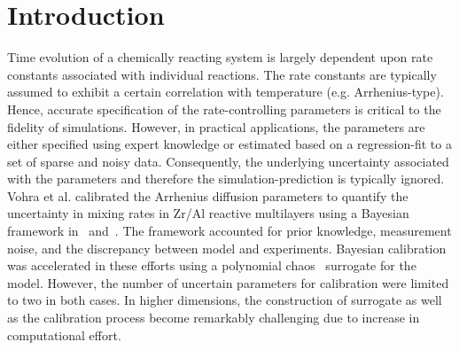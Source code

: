 \section{Introduction}
\label{sec:intro}



Time evolution of a chemically reacting system is largely dependent upon rate constants
associated with individual reactions. The rate constants are typically assumed to exhibit
a certain correlation with temperature (e.g. Arrhenius-type). Hence, accurate specification
of the rate-controlling parameters is critical to the fidelity of simulations. However,
in practical applications, the parameters are either specified using expert knowledge or
estimated based on a regression-fit to a set of sparse and noisy data. Consequently, the
underlying uncertainty associated with the parameters and therefore the simulation-prediction
is typically ignored. Vohra et al. calibrated the Arrhenius diffusion parameters to quantify
the uncertainty in mixing rates in Zr/Al reactive multilayers using a Bayesian framework
in~\cite{Vohra:2014} and~\cite{Vohra:2017}. The framework accounted for prior knowledge,
measurement noise, and the discrepancy between model and experiments. Bayesian calibration
was accelerated in these efforts using a polynomial chaos~\cite{Ghanem:2003, Xiu:2002} 
surrogate for the model. However,
the number of uncertain parameters for calibration were limited to two in both cases. In
higher dimensions, the construction of surrogate as well as the calibration process become
remarkably challenging due to increase in computational effort. 

